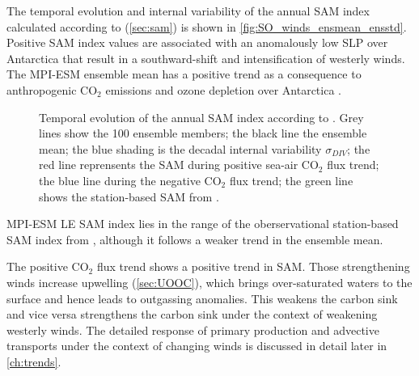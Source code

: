 The temporal evolution and internal variability of the annual \ac{SAM} index calculated according to \citep{Gong1999} (\autoref{sec:sam}) is shown in \autoref{fig:SO_winds_ensmean_ensstd}. Positive \acs{SAM} index values are associated with an anomalously low \acs{SLP} over Antarctica that result in a southward-shift and intensification of westerly winds. The \acs{MPI-ESM} ensemble mean has a positive trend as a consequence to anthropogenic CO$_2$ emissions and ozone depletion over Antarctica \citep{Thompson2011}.\newline


\begin{figure}[hbt]
        \myfloatalign
        \captionsetup[subfigure]{labelformat=empty,justification=centering}
        \caption{Temporal evolution of the annual \acf{SAM} index according to \citep{Gong1999}. Grey lines show the 100 ensemble members; the black line the ensemble mean; the blue shading is the decadal internal variability $\sigma_{DIV}$; the red line reprensents the SAM during positive sea-air CO$_2$ flux trend; the blue line during the negative CO$_2$ flux trend; the green line shows the station-based \acs{SAM} from \cite{Marshall2003}.}\label{fig:evolution_SAM}
\end{figure}



\acs{MPI-ESM LE} \ac{SAM} index lies in the range of the oberservational station-based \acs{SAM} index from \citep{Marshall2003}, although it follows a weaker trend in the ensemble mean.\newline

The positive CO$_2$ flux trend shows a positive trend in \acs{SAM}. Those strengthening winds increase upwelling (\autoref{sec:UOOC}), which brings over-saturated waters to the surface and hence leads to outgassing anomalies. This weakens the carbon sink and vice versa strengthens the carbon sink under the context of weakening westerly winds. The detailed response of primary production and advective transports under the context of changing winds is discussed in detail later in \autoref{ch:trends}.



